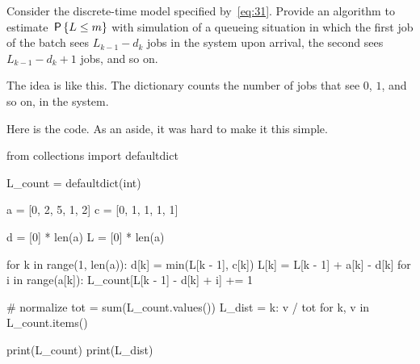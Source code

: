 \begin{exercise}\label{ex:l-166}
Consider 
 the discrete-time model specified by~\cref{eq:31}.
Provide
an algorithm to estimate  $\,\mathsf{P}\left\{L\leq m\right\}$ with  simulation of a queueing situation in which  the first job of the batch sees $L_{k-1} - d_k$ jobs in the system upon arrival,
the second sees $L_{k-1}-d_k + 1$ jobs, and so on.

\begin{solution}
The idea is like this. The dictionary  counts the number of jobs that see $0$, $1$, and so on, in the system.

Here is the code. As an aside, it was hard to make it this simple.
\begin{pyconsole}
from collections import defaultdict

L_count = defaultdict(int)

a = [0, 2, 5, 1, 2]
c = [0, 1, 1, 1, 1]

d = [0] * len(a)
L = [0] * len(a)

for k in range(1, len(a)):
    d[k] = min(L[k - 1], c[k])
    L[k] = L[k - 1] + a[k] - d[k]
    for i in range(a[k]):
        L_count[L[k - 1] - d[k] + i] += 1


# normalize
tot = sum(L_count.values())
L_dist = {k: v / tot for k, v in L_count.items()}

print(L_count)
print(L_dist)
\end{pyconsole}

\end{solution}
\end{exercise}



